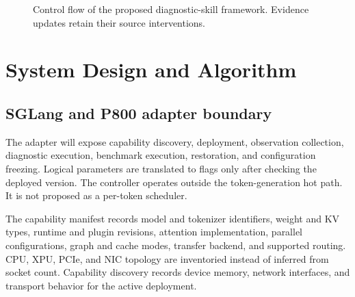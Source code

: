 \documentclass[11pt,a4paper]{article}
\begin{document}
\begin{figure}[t]
\centering
{}
\caption{Control flow of the proposed diagnostic-skill framework. Evidence updates retain their source interventions.}
\label{fig:architecture}
\end{figure}

\section{System Design and Algorithm}
\subsection{SGLang and P800 adapter boundary}
The adapter will expose capability discovery, deployment, observation collection, diagnostic execution, benchmark execution, restoration, and configuration freezing. Logical parameters are translated to flags only after checking the deployed version. The controller operates outside the token-generation hot path. It is not proposed as a per-token scheduler.

The capability manifest records model and tokenizer identifiers, weight and KV types, runtime and plugin revisions, attention implementation, parallel configurations, graph and cache modes, transfer backend, and supported routing. CPU, XPU, PCIe, and NIC topology are inventoried instead of inferred from socket count. Capability discovery records device memory, network interfaces, and transport behavior for the active deployment.
\end{document}
